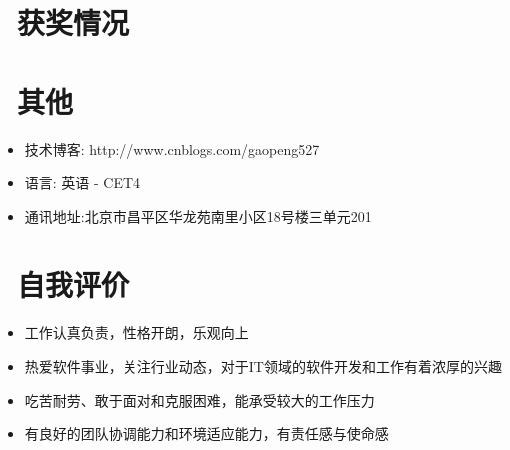 \documentclass{resume}
\begin{document}
\section{\faHeartO\ 获奖情况}

\section{\faInfo\ 其他}
\begin{itemize}[parsep=0.5ex]
  \item 技术博客: http://www.cnblogs.com/gaopeng527
  \item 语\hspace{2em}言: 英语 - CET4
  \item 通讯地址:北京市昌平区华龙苑南里小区18号楼三单元201
\end{itemize}

\section{\faTags\ 自我评价}
\begin{itemize}[parsep=0.5ex]
  \item 工作认真负责，性格开朗，乐观向上
  \item 热爱软件事业，关注行业动态，对于IT领域的软件开发和工作有着浓厚的兴趣
  \item 吃苦耐劳、敢于面对和克服困难，能承受较大的工作压力
  \item 有良好的团队协调能力和环境适应能力，有责任感与使命感
\end{itemize}

%
%
\end{document}
